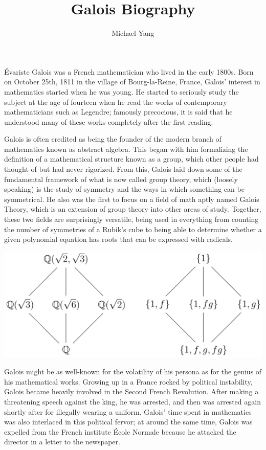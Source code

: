 \documentclass{article}
\title{Galois Biography}
\author{Michael Yang}
\begin{document}
Évariste Galois was a French mathematician who lived in the early 1800s. Born on October 25th, 1811 in the village of Bourg-la-Reine, France, Galois’ interest in mathematics started when he was young. He started to seriously study the subject at the age of fourteen when he read the works of contemporary mathematicians such as Legendre; famously precocious, it is said that he understood many of these works completely after the first reading. 

Galois is often credited as being the founder of the modern branch of mathematics known as abstract algebra. This began with him formalizing the definition of a mathematical structure known as a group, which other people had thought of but had never rigorized. From this, Galois laid down some of the fundamental framework of what is now called group theory, which (loosely speaking) is the study of symmetry and the ways in which something can be symmetrical. He also was the first to focus on a field of math aptly named Galois Theory, which is an extension of group theory into other areas of study. Together, these two fields are surprisingly versatile, being used in everything from counting the number of symmetries of a Rubik’s cube to being able to determine whether a given polynomial equation has roots that can be expressed with radicals.

\begin{center}
    \includegraphics[width=6in]{images/galois-theory.png}
\end{center}

Galois might be as well-known for the volatility of his persona as for the genius of his mathematical works. Growing up in a France rocked by political instability, Galois became heavily involved in the Second French Revolution. After making a threatening speech against the king, he was arrested, and then was arrested again shortly after for illegally wearing a uniform. Galois’ time spent in mathematics was also interlaced in this political fervor; at around the same time, Galois was expelled from the French institute École Normale because he attacked the director in a letter to the newspaper. 
\end{document}
